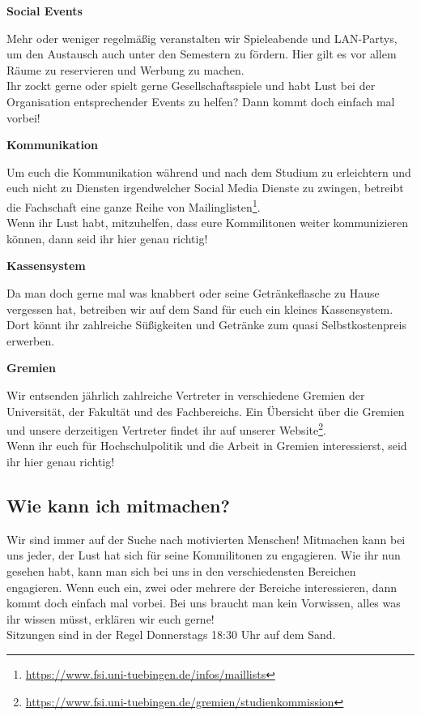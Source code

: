 \vfill \pagebreak
\textbf{Social Events}

Mehr oder weniger regelmäßig veranstalten wir Spieleabende und LAN-Partys, um
den Austausch auch unter den Semestern zu fördern. Hier gilt es vor allem Räume
zu reservieren und Werbung zu machen. \\
Ihr zockt gerne oder spielt gerne Gesellschaftsspiele und habt Lust bei der
Organisation entsprechender Events zu helfen? Dann kommt doch einfach mal
vorbei!

\textbf{Kommunikation}

Um euch die Kommunikation während und nach dem Studium zu erleichtern und euch
nicht zu Diensten irgendwelcher Social Media Dienste zu zwingen, betreibt die
Fachschaft eine ganze Reihe von
Mailinglisten\footnote{\url{https://www.fsi.uni-tuebingen.de/infos/maillists}}.
\\	%
Wenn ihr Lust habt, mitzuhelfen, dass eure Kommilitonen weiter kommunizieren
können, dann seid ihr hier genau richtig!

\textbf{Kassensystem}

Da man doch gerne mal was knabbert oder seine Getränkeflasche zu Hause
vergessen hat, betreiben wir auf dem Sand für euch ein kleines Kassensystem.
Dort könnt ihr zahlreiche Süßigkeiten und Getränke zum quasi Selbstkostenpreis
erwerben. 

\textbf{Gremien}

Wir entsenden jährlich zahlreiche Vertreter in verschiedene Gremien der
Universität, der Fakultät und des Fachbereichs. Ein Übersicht über die Gremien
und unsere derzeitigen Vertreter findet ihr auf unserer
Website\footnote{\url{https://www.fsi.uni-tuebingen.de/gremien/studienkommission}}.
\\	%
Wenn ihr euch für Hochschulpolitik und die Arbeit in Gremien interessierst,
seid ihr hier genau richtig!

%
\subsection{Wie kann ich mitmachen?}
Wir sind immer auf der Suche nach motivierten Menschen! Mitmachen kann bei uns
jeder, der Lust hat sich für seine Kommilitonen zu engagieren. Wie ihr nun
gesehen habt, kann man sich bei uns in den verschiedensten Bereichen
engagieren. Wenn euch ein, zwei oder mehrere der Bereiche interessieren, dann
kommt doch einfach mal vorbei. Bei uns braucht man kein Vorwissen, alles was
ihr wissen müsst, erklären wir euch gerne!\\
Sitzungen sind in der Regel Donnerstags 18:30 Uhr auf dem Sand.

